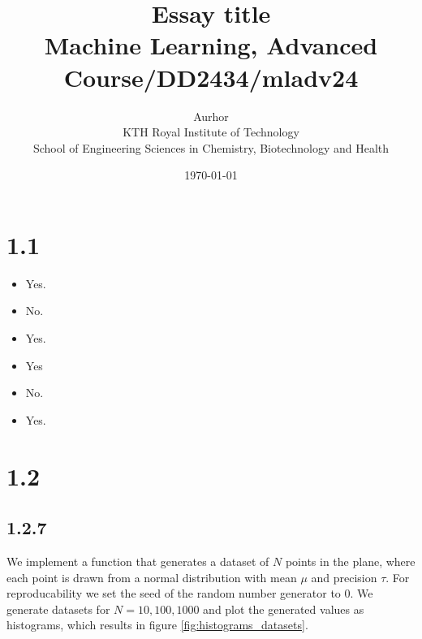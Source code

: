 \documentclass{article}
\title{Essay title\\\Large{Machine Learning, Advanced Course/DD2434/mladv24}}
\author{Aurhor \\ KTH Royal Institute of Technology\\ School of Engineering Sciences in Chemistry, Biotechnology and Health}
\date{\today}
\begin{document}
\maketitle
\thispagestyle{fancy}
\clearpage
\tableofcontents
\thispagestyle{fancy}

\clearpage
\fancyfoot[C]{\thepage}
\begin{multicols}{2}

    \section*{1.1}
    \begin{itemize}
        \item Yes.
        \item No.
        \item Yes.
        \item Yes
        \item No.
        \item Yes.
    \end{itemize}
    \section*{1.2}

    \subsection*{1.2.7}
    We implement a function that generates a dataset of $N$ points in the plane, where each point is drawn from a normal distribution with mean $\mu$ and precision $\tau$. For reproducability we set the seed of the random number generator to 0. We generate datasets for $N = 10, 100, 1000$ and plot the generated values as histograms, which results in figure \autoref{fig:histograms_datasets}. 


\end{multicols}
\end{document}
